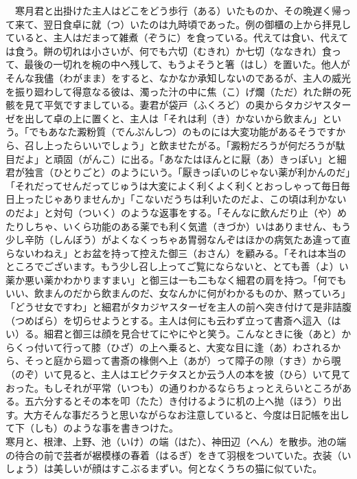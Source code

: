 　寒月君と出掛けた主人はどこをどう歩行（ある）いたものか、その晩遅く帰って来て、翌日食卓に就（つ）いたのは九時頃であった。例の御櫃の上から拝見していると、主人はだまって雑煮（ぞうに）を食っている。代えては食い、代えては食う。餅の切れは小さいが、何でも六切（むきれ）か七切（ななきれ）食って、最後の一切れを椀の中へ残して、もうよそうと箸（はし）を置いた。他人がそんな我儘（わがまま）をすると、なかなか承知しないのであるが、主人の威光を振り廻わして得意なる彼は、濁った汁の中に焦（こ）げ爛（ただ）れた餅の死骸を見て平気ですましている。妻君が袋戸（ふくろど）の奥からタカジヤスターゼを出して卓の上に置くと、主人は「それは利（き）かないから飲まん」という。「でもあなた澱粉質（でんぷんしつ）のものには大変功能があるそうですから、召し上ったらいいでしょう」と飲ませたがる。「澱粉だろうが何だろうが駄目だよ」と頑固（がんこ）に出る。「あなたはほんとに厭（あ）きっぽい」と細君が独言（ひとりごと）のようにいう。「厭きっぽいのじゃない薬が利かんのだ」「それだってせんだってじゅうは大変によく利くよく利くとおっしゃって毎日毎日上ったじゃありませんか」「こないだうちは利いたのだよ、この頃は利かないのだよ」と対句（ついく）のような返事をする。「そんなに飲んだり止（や）めたりしちゃ、いくら功能のある薬でも利く気遣（きづか）いはありません、もう少し辛防（しんぼう）がよくなくっちゃあ胃弱なんぞはほかの病気たあ違って直らないわねえ」とお盆を持って控えた御三（おさん）を顧みる。「それは本当のところでございます。もう少し召し上ってご覧にならないと、とても善（よ）い薬か悪い薬かわかりますまい」と御三は一も二もなく細君の肩を持つ。「何でもいい、飲まんのだから飲まんのだ、女なんかに何がわかるものか、黙っていろ」「どうせ女ですわ」と細君がタカジヤスターゼを主人の前へ突き付けて是非詰腹（つめばら）を切らせようとする。主人は何にも云わず立って書斎へ這入（はい）る。細君と御三は顔を見合せてにやにやと笑う。こんなときに後（あと）からくっ付いて行って膝（ひざ）の上へ乗ると、大変な目に逢（あ）わされるから、そっと庭から廻って書斎の椽側へ上（あが）って障子の隙（すき）から覗（のぞ）いて見ると、主人はエピクテタスとか云う人の本を披（ひら）いて見ておった。もしそれが平常（いつも）の通りわかるならちょっとえらいところがある。五六分するとその本を叩（たた）き付けるように机の上へ抛（ほう）り出す。大方そんな事だろうと思いながらなお注意していると、今度は日記帳を出して下（しも）のような事を書きつけた。\\

寒月と、根津、上野、池（いけ）の端（はた）、神田辺（へん）を散歩。池の端の待合の前で芸者が裾模様の春着（はるぎ）をきて羽根をついていた。衣装（いしょう）は美しいが顔はすこぶるまずい。何となくうちの猫に似ていた。\\

